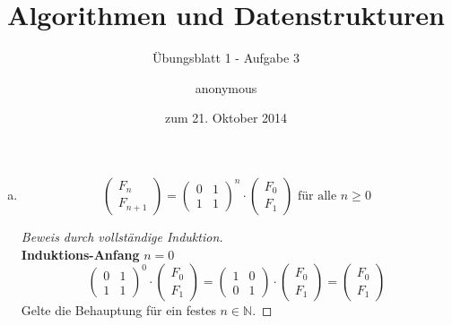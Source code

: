 \documentclass[a4paper]{scrartcl}
\title{Algorithmen und Datenstrukturen}
\subtitle{Übungsblatt 1 - Aufgabe 3}
\author{
    anonymous
}
\date{zum 21. Oktober 2014}
\begin{document}
\maketitle

\begin{enumerate}[(a)]
    \item
        \begin{behaupt}
            \begin{equation}
                \begin{pmatrix}
                    F_n \\ F_{n+1}
                \end{pmatrix}
                =
                \begin{pmatrix}
                    0 & 1 \\
                    1 & 1
                \end{pmatrix}^n
                \cdot
                \begin{pmatrix}
                    F_0 \\ F_1
                \end{pmatrix}
                \text{ für alle } n \geq 0
            \end{equation}
        \end{behaupt}
        \begin{proof}[Beweis durch vollständige Induktion] \hfill \\
            \textbf{Induktions-Anfang} $n = 0$ \\
            \begin{equation}
                \begin{pmatrix}
                    0 & 1 \\
                    1 & 1
                \end{pmatrix}^0
                \cdot
                \begin{pmatrix}
                    F_0 \\ F_1
                \end{pmatrix}
                =
                \begin{pmatrix}
                    1 & 0 \\
                    0 & 1
                \end{pmatrix}
                \cdot
                \begin{pmatrix}
                    F_0 \\ F_1
                \end{pmatrix}
                =
                \begin{pmatrix}
                    F_0 \\ F_1
                \end{pmatrix}
            \end{equation}
            Gelte die Behauptung für ein festes $n \in \mathbb{N}$.


\end{proof}
\end{enumerate}
\end{document}
